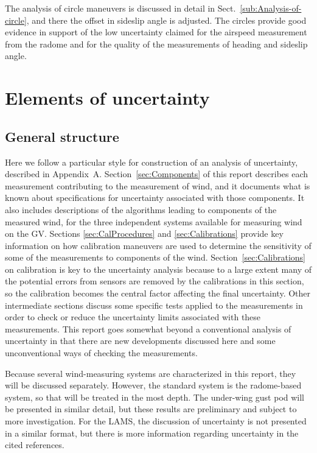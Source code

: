 \documentclass[12pt,twoside,english]{article}\usepackage[]{graphicx}\usepackage[]{color}
\let\stdsection\section
\renewcommand{\section}{\newpage\stdsection}
\let\OrgIndex\index
\renewcommand*{\index}[1]{\OrgIndex{#1}}
\begin{document}
The analysis of circle maneuvers is discussed in detail in Sect.~\ref{sub:Analysis-of-circle}, and there the offset in sideslip angle is adjusted. The circles provide good evidence in support of the low uncertainty claimed for the airspeed measurement from the radome and for the quality of the measurements of heading and sideslip angle. 





\section{Elements of uncertainty\label{sec:Uncertainty-components}}

\subsection{General structure}

Here we follow a particular style for construction of an analysis of uncertainty, described in Appendix~A. Section~\ref{sec:Components} of this report describes each measurement contributing to the measurement of wind, and it documents what is known about specifications for uncertainty associated with those components. It also includes descriptions of the algorithms leading to components of the measured wind, for the three independent systems available for measuring wind on the GV.  
Sections \ref{sec:CalProcedures} and \ref{sec:Calibrations} provide key information on how calibration maneuvers are used to determine the sensitivity of some of the measurements to components of the wind. Section~\ref{sec:Calibrations} on calibration is key to the uncertainty analysis because to a large extent many of the potential errors from sensors are removed by the calibrations in this section, so the calibration becomes the central factor affecting the final uncertainty. Other intermediate sections discuss some specific tests applied to the measurements in order to check or reduce the uncertainty limits associated with these measurements. This report goes somewhat beyond a conventional analysis of uncertainty in that there are new developments discussed here and some unconventional ways of checking the measurements.  

Because several wind-measuring systems are characterized in this report, they will be discussed separately. However, the standard system is the radome-based system, so that will be treated in the most depth. The under-wing gust pod will be presented in similar detail, but these results are preliminary and subject to more investigation. For the LAMS, the discussion of uncertainty is not presented in a similar format, but there is more information regarding uncertainty in the cited references. 
\end{document}
